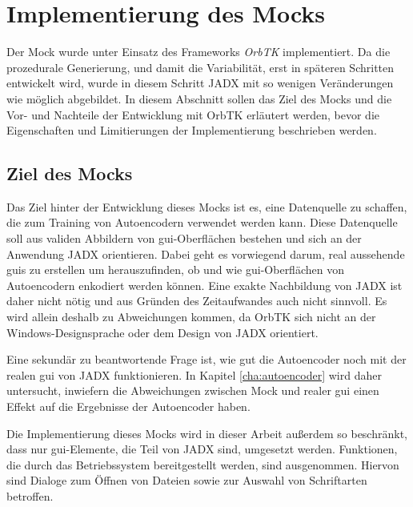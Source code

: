 
\section{Implementierung des Mocks}
\label{sec:impl}
Der Mock wurde unter Einsatz des Frameworks \emph{OrbTK} implementiert. Da die prozedurale Generierung, und damit die Variabilität, erst in späteren Schritten entwickelt wird, wurde in diesem Schritt JADX mit so wenigen Veränderungen wie möglich abgebildet. In diesem Abschnitt sollen das Ziel des Mocks und die Vor- und Nachteile der Entwicklung mit OrbTK erläutert werden, bevor die Eigenschaften und Limitierungen der Implementierung beschrieben werden.

\subsection{Ziel des Mocks}
\label{subsec:goal_mock}
Das Ziel hinter der Entwicklung dieses Mocks ist es, eine Datenquelle zu schaffen, die zum Training von Autoencodern verwendet werden kann. Diese Datenquelle soll aus validen Abbildern von \gls{gui}-Oberflächen bestehen und sich an der Anwendung JADX orientieren. Dabei geht es vorwiegend darum, real aussehende \glspl{gui} zu erstellen um herauszufinden, ob und wie \gls{gui}-Oberflächen von Autoencodern enkodiert werden können. Eine exakte Nachbildung von JADX ist daher nicht nötig und aus Gründen des Zeitaufwandes auch nicht sinnvoll. Es wird allein deshalb zu Abweichungen kommen, da OrbTK sich nicht an der Windows-Designsprache oder dem Design von JADX orientiert.

Eine sekundär zu beantwortende Frage ist, wie gut die Autoencoder noch mit der realen \gls{gui} von JADX funktionieren. In Kapitel \ref{cha:autoencoder} wird daher untersucht, inwiefern die Abweichungen zwischen Mock und realer \gls{gui} einen Effekt auf die Ergebnisse der Autoencoder haben.

Die Implementierung dieses Mocks wird in dieser Arbeit außerdem so beschränkt, dass nur \gls{gui}-Elemente, die Teil von JADX sind, umgesetzt werden. Funktionen, die durch das Betriebssystem bereitgestellt werden, sind ausgenommen. Hiervon sind Dialoge zum Öffnen von Dateien sowie zur Auswahl von Schriftarten betroffen.

